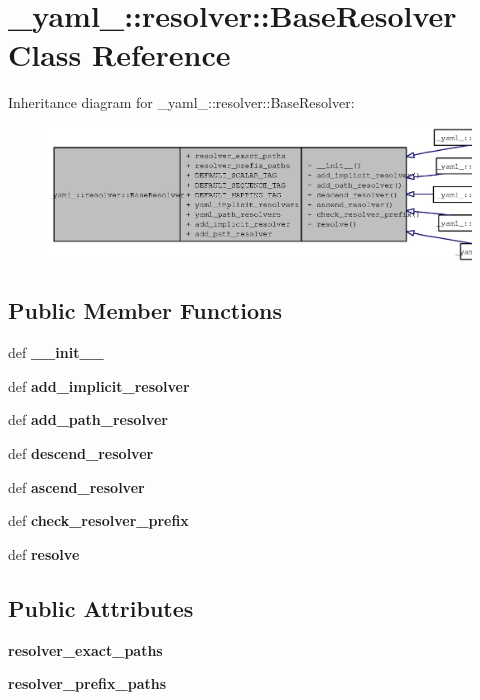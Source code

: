 \section{\_\-yaml\_\-::resolver::BaseResolver Class Reference}
\label{class__yaml___1_1resolver_1_1BaseResolver}
Inheritance diagram for \_\-yaml\_\-::resolver::BaseResolver:\nopagebreak
\begin{figure}[H]
\begin{center}
\leavevmode
\includegraphics[width=400pt]{class__yaml___1_1resolver_1_1BaseResolver__inherit__graph}
\end{center}
\end{figure}
\subsection*{Public Member Functions}
\begin{CompactItemize}
\item 
def {\bf \_\-\_\-init\_\-\_\-}
\item 
def {\bf add\_\-implicit\_\-resolver}
\item 
def {\bf add\_\-path\_\-resolver}
\item 
def {\bf descend\_\-resolver}
\item 
def {\bf ascend\_\-resolver}
\item 
def {\bf check\_\-resolver\_\-prefix}
\item 
def {\bf resolve}
\end{CompactItemize}
\subsection*{Public Attributes}
\begin{CompactItemize}
\item 
{\bf resolver\_\-exact\_\-paths}
\item 
{\bf resolver\_\-prefix\_\-paths}
\end{CompactItemize}
